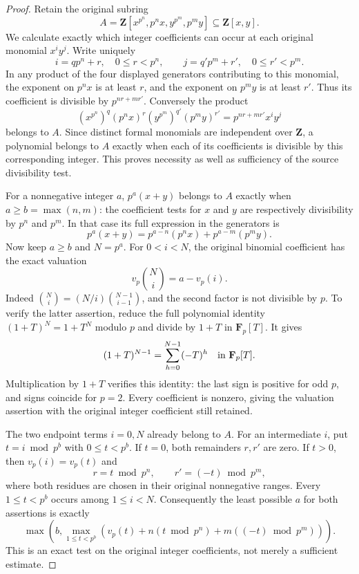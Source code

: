 \begin{proof}
Retain the original subring
$$
A=\mathbf Z[x^{p^n},p^n x,y^{p^m},p^m y]
\subseteq\mathbf Z[x,y].
$$
We calculate exactly which integer
coefficients can occur at each original
monomial $x^i y^j$. Write uniquely
$$
i=q p^n+r,\quad 0\leq r<p^n,
\qquad j=q' p^m+r',\quad 0\leq r'<p^m.
$$
In any product of the four displayed
generators contributing to this
monomial, the exponent on $p^n x$
is at least $r$, and the exponent
on $p^m y$ is at least $r'$.
Thus its coefficient is divisible
by $p^{nr+mr'}$. Conversely the
product
$$
(x^{p^n})^q(p^n x)^r
(y^{p^m})^{q'}(p^m y)^{r'}
=p^{nr+mr'}x^i y^j
$$
belongs to $A$. Since distinct formal
monomials are independent over
$\mathbf Z$, a polynomial belongs
to $A$ exactly when each of its
coefficients is divisible by this
corresponding integer. This proves
necessity as well as sufficiency
of the source divisibility test.

For a nonnegative integer $a$,
$p^a(x+y)$ belongs to $A$ exactly
when $a\geq b=\max(n,m)$: the
coefficient tests for $x$ and $y$
are respectively divisibility by
$p^n$ and $p^m$. In that case its
full expression in the generators is
$$
p^a(x+y)=p^{a-n}(p^n x)+p^{a-m}(p^m y).
$$
Now keep $a\geq b$ and $N=p^a$.
For $0<i<N$, the original binomial
coefficient has the exact valuation
$$
v_p\binom Ni=a-v_p(i).
$$
Indeed
$\binom Ni=(N/i)\binom{N-1}{i-1}$,
and the second factor is not divisible
by $p$. To verify the latter assertion,
reduce the full polynomial identity
$(1+T)^N=1+T^N$ modulo $p$ and divide
by $1+T$ in $\mathbf F_p[T]$.
It gives
$$
(1+T)^{N-1}=\sum_{h=0}^{N-1}(-T)^h
\quad\hbox{in }\mathbf F_p[T].
$$
Multiplication by $1+T$ verifies this
identity: the last sign is positive
for odd $p$, and signs coincide for
$p=2$. Every coefficient is nonzero,
giving the valuation assertion with
the original integer coefficient
still retained.

The two endpoint terms $i=0,N$
already belong to $A$. For an
intermediate $i$, put $t=i\bmod p^b$
with $0\leq t<p^b$. If $t=0$, both
remainders $r,r'$ are zero. If $t>0$,
then $v_p(i)=v_p(t)$ and
$$
r=t\bmod p^n,\qquad
r'=(-t)\bmod p^m,
$$
where both residues are chosen in
their original nonnegative ranges.
Every $1\leq t<p^b$ occurs among
$1\leq i<N$. Consequently the least
possible $a$ for both assertions
is exactly
$$
\max\left(b,
\max_{1\leq t<p^b}
\left(v_p(t)+n(t\bmod p^n)+m((-t)\bmod p^m)\right)\right).
$$
This is an exact test on the
original integer coefficients,
not merely a sufficient estimate.


\end{proof}
